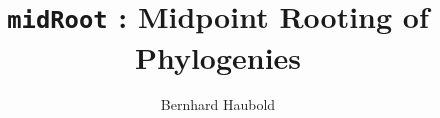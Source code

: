 

\pagestyle{noweb}

\title{\texttt{midRoot} : Midpoint Rooting of Phylogenies}
\author{Bernhard Haubold}

\date{}
\maketitle






